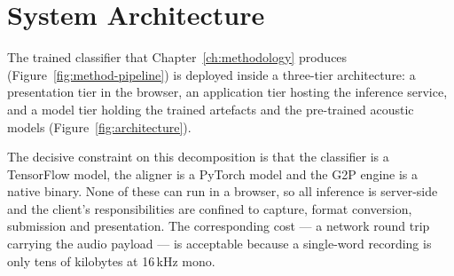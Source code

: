 \section{System Architecture}
\label{sec:architecture}

The trained classifier that Chapter~\ref{ch:methodology} produces
(Figure~\ref{fig:method-pipeline}) is deployed inside a three-tier
architecture: a presentation tier in the browser, an application tier hosting
the inference service, and a model tier holding the trained artefacts and the
pre-trained acoustic models (Figure~\ref{fig:architecture}).

The decisive constraint on this decomposition is that the classifier is a
TensorFlow model, the aligner is a PyTorch model and the G2P engine is a native
binary. None of these can run in a browser, so all inference is server-side and
the client's responsibilities are confined to capture, format conversion,
submission and presentation. The corresponding cost --- a network round trip
carrying the audio payload --- is acceptable because a single-word recording
is only tens of kilobytes at 16\,kHz mono.

